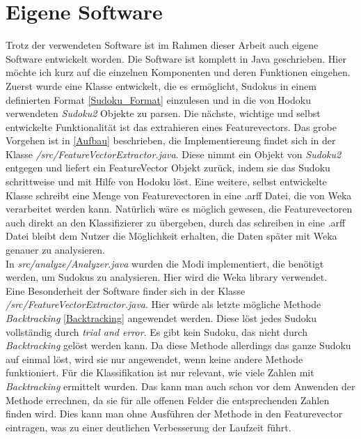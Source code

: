 \newpage
\section{Eigene Software}
\label{Eigene_Software}
Trotz der verwendeten Software ist im Rahmen dieser Arbeit auch eigene Software entwickelt worden. Die Software ist komplett in Java geschrieben. Hier möchte ich kurz auf die einzelnen Komponenten und deren Funktionen eingehen.\\
Zuerst wurde eine Klasse entwickelt, die es ermöglicht, Sudokus in einem definierten Format \ref{Sudoku_Format} einzulesen und in die von Hodoku verwendeten \textit{Sudoku2} Objekte zu parsen. Die nächste, wichtige und selbst entwickelte Funktionalität ist 
das extrahieren eines Featurevectors. Das grobe Vorgehen ist in \ref{Aufbau} beschrieben, die Implementiereung findet sich in der Klasse \textit{/src/FeatureVectorExtractor.java}. Diese nimmt ein Objekt von \textit{Sudoku2} entgegen und liefert ein FeatureVector Objekt zurück, indem sie das Sudoku schrittweise und mit Hilfe von Hodoku löst. Eine weitere, selbst entwickelte Klasse schreibt eine Menge von Featurevectoren in eine .arff Datei, die von Weka verarbeitet werden kann. Natürlich wäre es möglich gewesen, die Featurevectoren auch direkt an den Klassifizierer zu übergeben, durch das schreiben in eine .arff Datei bleibt dem Nutzer die Möglichkeit erhalten, die Daten später mit Weka genauer zu analysieren.\\
In \textit{src/analyze/Analyzer.java} wurden die Modi implementiert, die benötigt werden, um Sudokus zu analysieren. Hier wird die Weka library verwendet.\\
Eine Besonderheit der Software finder sich in der Klasse \textit{/src/FeatureVectorExtractor.java}. Hier würde als letzte mögliche Methode \textit{Backtracking} \ref{Backtracking} angewendet werden. Diese löst jedes Sudoku vollständig durch \textit{trial and error}. Es gibt kein Sudoku, das nicht durch \textit{Backtracking} gelöst werden kann. Da diese Methode allerdings das ganze Sudoku auf einmal löst, wird sie nur angewendet, wenn keine andere Methode funktioniert. Für die Klassifikation ist nur relevant, wie viele Zahlen mit \textit{Backtracking} ermittelt wurden. Das kann man auch schon vor dem Anwenden der Methode errechnen, da sie für alle offenen Felder die entsprechenden Zahlen finden wird. Dies kann man ohne Ausführen der Methode in den Featurevector eintragen, was zu einer deutlichen Verbesserung der Laufzeit führt.

